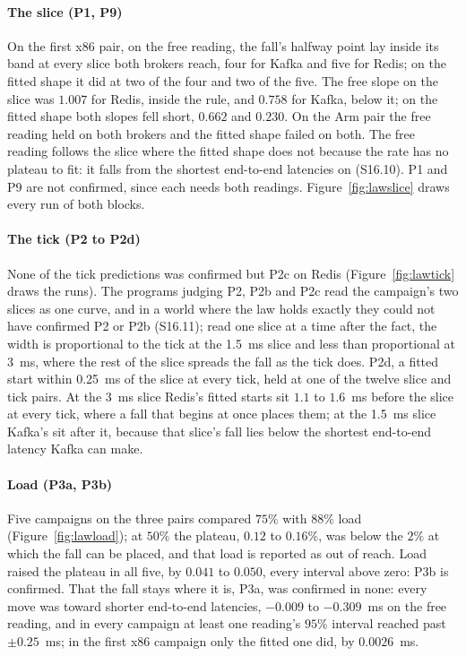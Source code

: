 \documentclass[10pt,journal,onecolumn]{IEEEtran}
\newcommand{\kafka}{Kafka}
\newcommand{\redis}{Redis}
\begin{document}
\paragraph{The slice (P1, P9)} On the first x86 pair, on the free reading, the fall's halfway
point lay inside its band at every slice both brokers reach, four for \kafka{} and five for
\redis{}; on the fitted shape it did at two of the four and two of the five. The free slope on
the slice was $1.007$ for \redis{}, inside the rule, and $0.758$ for \kafka{}, below it; on the
fitted shape both slopes fell short, $0.662$ and $0.230$. On the Arm pair the free reading held
on both brokers and the fitted shape failed on both. The free reading follows
the slice where the fitted shape does not because the rate has no plateau to fit: it falls from
the shortest end-to-end latencies on (S16.10). P1 and P9 are not confirmed, since each needs both readings.
Figure~\ref{fig:lawslice} draws every run of both blocks.

\paragraph{The tick (P2 to P2d)} None of the tick predictions was confirmed but P2c on
\redis{} (Figure~\ref{fig:lawtick} draws the runs). The programs judging P2, P2b and P2c read the campaign's two slices as one curve, and
in a world where the law holds exactly they could not have confirmed P2 or P2b (S16.11); read one
slice at a time after the fact, the width is proportional to the tick at the 1.5~ms slice and
less than proportional at 3~ms, where the rest of the slice spreads the fall as the tick does.
P2d, a fitted start within 0.25~ms of the slice at every tick, held at one of the twelve slice
and tick pairs. At the 3~ms slice \redis{}'s fitted starts sit $1.1$ to $1.6$~ms before the
slice at every tick, where a fall that begins at once places them; at the 1.5~ms slice
\kafka{}'s sit after it, because that slice's fall lies below the shortest end-to-end latency \kafka{}
can make.

\paragraph{Load (P3a, P3b)} Five campaigns on the three pairs compared $75\%$ with $88\%$ load
(Figure~\ref{fig:lawload}); at
$50\%$ the plateau, $0.12$ to $0.16\%$, was below the $2\%$ at which the fall can be placed, and
that load is reported as out of reach. Load raised the plateau in all five, by $0.041$ to $0.050$,
every interval above zero: P3b is confirmed. That the fall stays where it is, P3a, was confirmed
in none: every move was toward shorter end-to-end latencies, $-0.009$ to $-0.309$~ms on the free reading,
and in every campaign at least one reading's $95\%$ interval reached past $\pm 0.25$~ms; in the
first x86 campaign only the fitted one did, by $0.0026$~ms.
\end{document}
